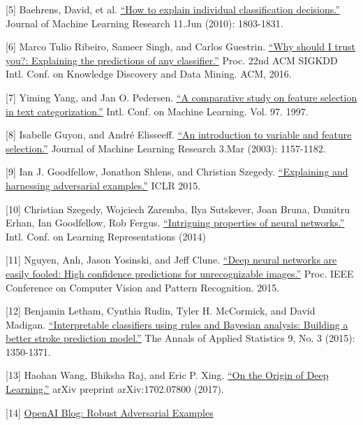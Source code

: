 {[}5{]} Baehrens, David, et al. \href{http://www.jmlr.org/papers/volume11/baehrens10a/baehrens10a.pdf}{``How to explain individual classification decisions.''} Journal of Machine Learning Research 11.Jun (2010): 1803-1831.

{[}6{]} Marco Tulio Ribeiro, Sameer Singh, and Carlos Guestrin. \href{https://arxiv.org/pdf/1602.04938.pdf}{``Why should I trust you?: Explaining the predictions of any classifier.''} Proc. 22nd ACM SIGKDD Intl. Conf. on Knowledge Discovery and Data Mining. ACM, 2016.

{[}7{]} Yiming Yang, and Jan O. Pedersen. \href{http://www.surdeanu.info/mihai/teaching/ista555-spring15/readings/yang97comparative.pdf}{``A comparative study on feature selection in text categorization.''} Intl. Conf. on Machine Learning. Vol. 97. 1997.

{[}8{]} Isabelle Guyon, and André Elisseeff. \href{http://www.jmlr.org/papers/volume3/guyon03a/guyon03a.pdf}{``An introduction to variable and feature selection.''} Journal of Machine Learning Research 3.Mar (2003): 1157-1182.

{[}9{]} Ian J. Goodfellow, Jonathon Shlens, and Christian Szegedy. \href{https://arxiv.org/pdf/1412.6572.pdf}{``Explaining and harnessing adversarial examples.''} ICLR 2015.

{[}10{]} Christian Szegedy, Wojciech Zaremba, Ilya Sutskever, Joan Bruna, Dumitru Erhan, Ian Goodfellow, Rob Fergus. \href{https://arxiv.org/abs/1312.6199}{``Intriguing properties of neural networks.''} Intl. Conf. on Learning Representations (2014)

{[}11{]} Nguyen, Anh, Jason Yosinski, and Jeff Clune. \href{http://www.cv-foundation.org/openaccess/content_cvpr_2015/papers/Nguyen_Deep_Neural_Networks_2015_CVPR_paper.pdf}{``Deep neural networks are easily fooled: High confidence predictions for unrecognizable images.''} Proc. IEEE Conference on Computer Vision and Pattern Recognition. 2015.

{[}12{]} Benjamin Letham, Cynthia Rudin, Tyler H. McCormick, and David Madigan. \href{https://arxiv.org/abs/1511.01644}{``Interpretable classifiers using rules and Bayesian analysis: Building a better stroke prediction model.''} The Annals of Applied Statistics 9, No. 3 (2015): 1350-1371.

{[}13{]} Haohan Wang, Bhiksha Raj, and Eric P. Xing. \href{https://arxiv.org/pdf/1702.07800.pdf}{``On the Origin of Deep Learning.''} arXiv preprint arXiv:1702.07800 (2017).

{[}14{]} \href{https://blog.openai.com/robust-adversarial-inputs/}{OpenAI Blog: Robust Adversarial Examples}

